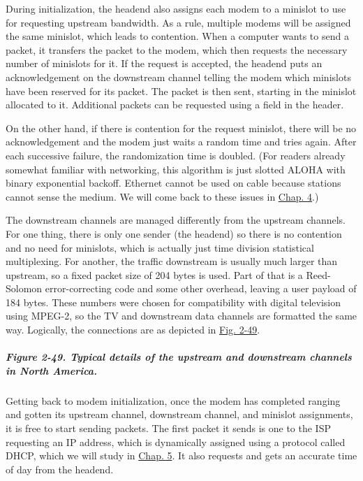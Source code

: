 During initialization, the headend also assigns each modem to a minislot
to use for requesting upstream bandwidth. As a rule, multiple modems
will be assigned the same minislot, which leads to contention. When a
computer wants to send a packet, it transfers the packet to the modem,
which then requests the necessary number of minislots for it. If the
request is accepted, the headend puts an acknowledgement on the
downstream channel telling the modem which minislots have been reserved
for its packet. The packet is then sent, starting in the minislot
allocated to it. Additional packets can be requested using a field in
the header.

On the other hand, if there is contention for the request minislot,
there will be no acknowledgement and the modem just waits a random time
and tries again. After each successive failure, the randomization time
is doubled. (For readers already somewhat familiar with networking, this
algorithm is just slotted ALOHA with binary exponential backoff.
Ethernet cannot be used on cable because stations cannot sense the
medium. We will come back to these issues in
\protect\hyperlink{0130661023_ch04.htmlux5cux23ch04}{Chap. 4}.)

The downstream channels are managed differently from the upstream
channels. For one thing, there is only one sender (the headend) so there
is no contention and no need for minislots, which is actually just time
division statistical multiplexing. For another, the traffic downstream
is usually much larger than upstream, so a fixed packet size of 204
bytes is used. Part of that is a Reed-Solomon error-correcting code and
some other overhead, leaving a user payload of 184 bytes. These numbers
were chosen for compatibility with digital television using MPEG-2, so
the TV and downstream data channels are formatted the same way.
Logically, the connections are as depicted in
\protect\hyperlink{0130661023_ch02lev1sec7.htmlux5cux23ch02fig49}{Fig.
2-49}.

\subparagraph[Figure 2-49. Typical details of the upstream and
downstream channels in North
America.]{\texorpdfstring{\protect\hypertarget{0130661023_ch02lev1sec7.htmlux5cux23ch02fig49}{}{}Figure
2-49. Typical details of the upstream and downstream channels in North
America.}{Figure 2-49. Typical details of the upstream and downstream channels in North America.}}


Getting back to modem initialization, once the modem has completed
ranging and gotten its upstream channel, downstream channel, and
minislot assignments, it is free to start sending packets. The first
packet it sends is one to the ISP requesting an IP address, which is
dynamically assigned using a protocol called DHCP, which we will study
in \protect\hyperlink{0130661023_ch05.htmlux5cux23ch05}{Chap. 5}. It
also requests and gets an accurate time of day from the headend.

